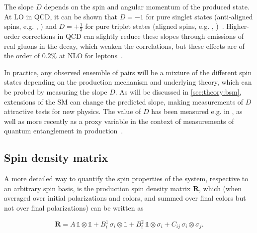 The slope $D$ depends on the spin and angular momentum of the produced \ttbar state. At LO in QCD, it can be shown that $D=-1$ for pure singlet states (anti-aligned spins, e.g. , ) and $D=+\frac{1}{3}$ for pure triplet states (aligned spins, e.g. , )~\cite{Maltoni:2024tul,Cheng:2024btk}. Higher-order corrections in QCD can slightly reduce these slopes through emissions of real gluons in the decay, which weaken the correlations, but these effects are of the order of $0.2\%$ at NLO for leptons~\cite{Czarnecki:1990pe,Bernreuther:2003ga}. %

In practice, any observed ensemble of \ttbar pairs will be a mixture of the different spin states depending on the production mechanism and underlying theory, which can be probed by measuring the slope $D$. As will be discussed in \cref{sec:theory:bsm}, extensions of the SM can change the predicted slope, making measurements of $D$ attractive tests for new physics. The value of $D$ has been measured e.g. in , as well as more recently as a proxy variable in the context of measurements of quantum entanglement in \ttbar production~\cite{CMS:TOP-23-001,ATLAS:2023fsd}.


\subsection{Spin density matrix}
\label{sec:theory:spindensity}

A more detailed way to quantify the spin properties of the \ttbar system, respective to an arbitrary spin basis, is the production spin density matrix $\mathbf{R}$, which (when averaged over initial polarizations and colors, and summed over final colors but not over final polarizations) can be written as~\cite{Maltoni:2024tul,Cheng:2024btk,Anuar:PhD}

\begin{equation}
    \mathbf{R} = A \, \mathbb{1} \otimes \mathbb{1}
    + B_i^1 \, \sigma_i \otimes \mathbb{1}
    + B_i^2 \, \mathbb{1} \otimes \sigma_i
    + C_{ij} \, \sigma_i \otimes \sigma_j.
\end{equation}

